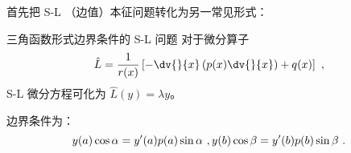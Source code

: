 

\begin{issues}
\issueDraft
\issueTODO
\end{issues}

首先把 S-L （边值）本征问题转化为另一常见形式：
\begin{definition}{三角函数形式边界条件的 S-L 问题}
对于微分算子
\begin{equation}
\hat L = \frac{1}{r(x)} \left[-\dv{}{x}\left(p(x)\dv{}{x}\right) + q(x)\right] ~,
\end{equation}
S-L 微分方程可化为 $\hat L (y) = \lambda y$。

边界条件为：
\begin{equation}
y(a) \cos \alpha = y'(a) p(a) \sin \alpha ~, \\
y(b) \cos \beta = y'(b) p(b) \sin \beta ~.
\end{equation}

\end{definition}